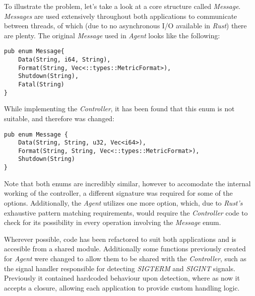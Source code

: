 \documentclass[12pt,a4paper,table]{article}
\begin{document}
            To illustrate the problem, let's take a look at a core structure called \textit{Message}. \textit{Messages} are used extensively throughout both applications to communicate between threads, of which (due to no asynchronous I/O available in \textit{Rust}) there are plenty. The original \textit{Message} used in \textit{Agent} looks like the following:
\begin{verbatim}
pub enum Message{
    Data(String, i64, String),
    Format(String, Vec<::types::MetricFormat>),
    Shutdown(String),
    Fatal(String)
}
\end{verbatim}
            While implementing the \textit{Controller}, it has been found that this enum is not suitable, and therefore was changed:
\begin{verbatim}
pub enum Message {
    Data(String, String, u32, Vec<i64>),
    Format(String, String, Vec<::types::MetricFormat>),
    Shutdown(String)
}
\end{verbatim}
            Note that both enums are incredibly similar, however to accomodate the internal working of the controller, a different signature was required for some of the options. Additionally, the \textit{Agent} utilizes one more option, which, due to \textit{Rust's} exhaustive pattern matching requirements, would require the \textit{Controller} code to check for its possibility in every operation involving the \textit{Message} enum.

            Wherever possible, code has been refactored to suit both applications and is accesible from a shared module. Additionally some functions previously created for \textit{Agent} were changed to allow them to be shared with the \textit{Controller}, such as the signal handler responsible for detecting \textit{SIGTERM} and \textit{SIGINT} signals. Previously it contained hardcoded behaviour upon detection, where as now it accepts a closure, allowing each application to provide custom handling logic.
\end{document}
